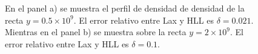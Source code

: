 \documentclass[12pt,a4paper]{book}
\begin{document}
\begin{figure}
\centering
{}
\caption{\label{fig:perfil_de_densidad_jet} En el panel a) se muestra el perfil de densidad de densidad de la recta $y = 0.5 \times 10^9$. El error relativo entre Lax y HLL es $\delta = 0.021$. Mientras en el panel b) se muestra sobre la recta $y = 2 \times 10^9$. El error relativo entre Lax y HLL es $\delta = 0.1$. }
\end{figure}


%
\end{document}
